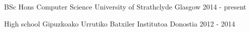 

\begin{cventries}

  \cventry
    {BSc Hons Computer Science} %
    {University of Strathclyde} %
    {Glasgow} %
    {2014 - present} %
    {}

  \cventry
    {High school} %
    {Gipuzkoako Urrutiko Batxiler Institutoa} %
    {Donostia} %
    {2012 - 2014} %
    {}

\end{cventries}

